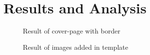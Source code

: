 \chapter{Results and Analysis}

\begin{figure}[h!]
	\centering
	\caption{Result of cover-page with border}
	\label{resul1}
\end{figure}

\begin{figure}[h!]
	\centering
	\caption{Result of images added in template}
	\label{result2}
\end{figure}
